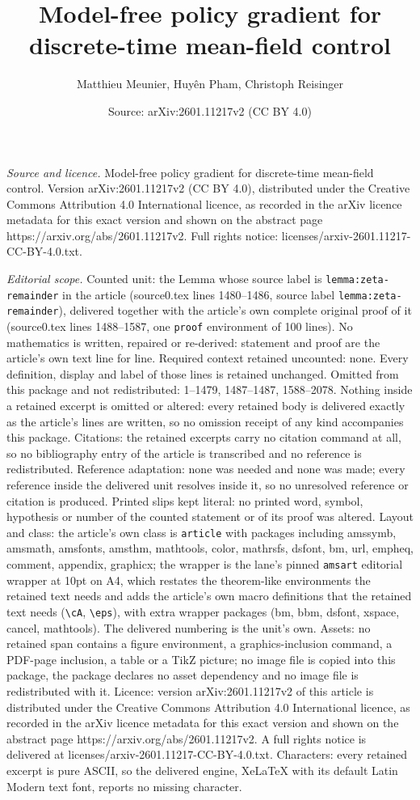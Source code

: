 \documentclass[10pt,a4paper]{amsart}
\title[Model-free policy gradient for discrete-time mean-field cont]{Model-free policy gradient for discrete-time mean-field control}
\author{Matthieu Meunier, Huy\^en Pham, Christoph Reisinger}
\date{Source: arXiv:2601.11217v2 (CC BY 4.0)}
\begin{document}
\maketitle

\noindent\emph{Source and licence.} Model-free policy gradient for discrete-time mean-field control. Version arXiv:2601.11217v2 (CC BY 4.0), distributed under the Creative Commons Attribution 4.0 International licence, as recorded in the arXiv licence metadata for this exact version and shown on the abstract page https://arxiv.org/abs/2601.11217v2. Full rights notice: licenses/arxiv-2601.11217-CC-BY-4.0.txt.\par\smallskip

\noindent\textit{Editorial scope.} Counted unit: the Lemma whose source label is \texttt{lemma:zeta-remainder} in the article (source0.tex lines 1480--1486, source label \texttt{lemma:zeta-remainder}), delivered together with the article's own complete original proof of it (source0.tex lines 1488--1587, one \texttt{proof} environment of 100 lines). No mathematics is written, repaired or re-derived: statement and proof are the article's own text line for line. Required context retained uncounted: none. Every definition, display and label of those lines is retained unchanged. Omitted from this package and not redistributed: 1--1479, 1487--1487, 1588--2078. Nothing inside a retained excerpt is omitted or altered: every retained body is delivered exactly as the article's lines are written, so no omission receipt of any kind accompanies this package. Citations: the retained excerpts carry no citation command at all, so no bibliography entry of the article is transcribed and no reference is redistributed. Reference adaptation: none was needed and none was made; every reference inside the delivered unit resolves inside it, so no unresolved reference or citation is produced. Printed slips kept literal: no printed word, symbol, hypothesis or number of the counted statement or of its proof was altered. Layout and class: the article's own class is \texttt{article} with packages including amssymb, amsmath, amsfonts, amsthm, mathtools, color, mathrsfs, dsfont, bm, url, empheq, comment, appendix, graphicx; the wrapper is the lane's pinned \texttt{amsart} editorial wrapper at 10pt on A4, which restates the theorem-like environments the retained text needs and adds the article's own macro definitions that the retained text needs (\texttt{\textbackslash cA}, \texttt{\textbackslash eps}), with extra wrapper packages (bm, bbm, dsfont, xspace, cancel, mathtools). The delivered numbering is the unit's own. Assets: no retained span contains a figure environment, a graphics-inclusion command, a PDF-page inclusion, a table or a TikZ picture; no image file is copied into this package, the package declares no asset dependency and no image file is redistributed with it. Licence: version arXiv:2601.11217v2 of this article is distributed under the Creative Commons Attribution 4.0 International licence, as recorded in the arXiv licence metadata for this exact version and shown on the abstract page https://arxiv.org/abs/2601.11217v2. A full rights notice is delivered at licenses/arxiv-2601.11217-CC-BY-4.0.txt. Characters: every retained excerpt is pure ASCII, so the delivered engine, XeLaTeX with its default Latin Modern text font, reports no missing character.
\end{document}
